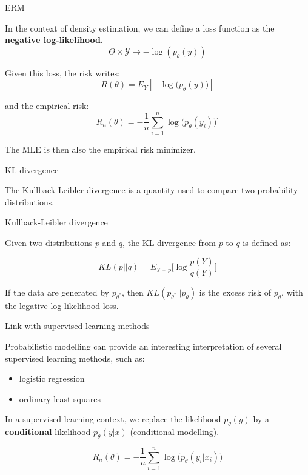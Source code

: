 \documentclass[usenames,dvipsnames]{beamer}
\begin{document}
\begin{frame}{ERM}

In the context of density estimation, we can define a loss function as the \textbf{{negative log-likelihood.}}
\begin{equation*}
    \Theta\times \mathcal{Y} \mapsto - \log(p_{\theta}(y))
\end{equation*}

Given this loss, the risk writes:
\begin{equation*}
    R(\theta) = E_Y[-\log\big(p_{\theta}(y)\big)]
\end{equation*}

and the empirical risk:
\begin{equation*}
    R_n(\theta) =-\frac{1}{n} \sum^{n}_{i=1} \log\big(p_{\theta}(y_i)\big)]
\end{equation*}

The MLE is then also the empirical risk minimizer.
    
\end{frame}

\begin{frame}{KL divergence}
    
The Kullback-Leibler divergence is a quantity used to compare two probability distributions.

\begin{definition}{Kullback-Leibler divergence}

    Given two distributions $p$ and $q$, the KL divergence from $p$ to $q$ is defined as:

    \begin{equation*}
	KL(p||q) = E_{Y\sim p} \Big[\log \frac{p(Y)}{q(Y)} \Big]
    \end{equation*}
\end{definition}

\begin{lemma}
    
    If the data are generated by $p_{\theta^*}$, then $ KL(p_{\theta^*}||p_{\theta})$ is the excess risk of $p_{\theta}$, with the legative log-likelihood loss.
\end{lemma}
\end{frame}

\begin{frame}{Link with supervised learning methods}

    Probabilistic modelling can provide an interesting interpretation of several supervised learning methods, such as:
    \begin{itemize}
    	\item logistic regression
	\item ordinary least squares
    \end{itemize}

    In a supervised learning context, we replace the likelihood $p_{\theta}(y)$ by a \textbf{conditional} likelihood $p_{\theta}(y|x)$ (conditional modelling).

\begin{equation}
    R_n(\theta) = - \frac{1}{n} \sum^{n}_{i=1} \log\big(p_{\theta}(y_i|x_i)\big)
\end{equation}
\end{frame}
\end{document}
